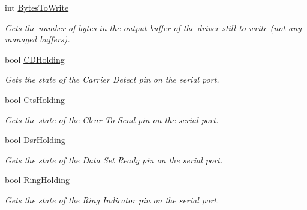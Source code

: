 \begin{DoxyCompactItemize}
int \mbox{\hyperlink{class_r_j_c_p_1_1_i_o_1_1_ports_1_1_native_1_1_unix_native_serial_a808ab45c7f5b01cf20ed91d731eef703}{Bytes\+To\+Write}}
\begin{DoxyCompactList}\small\item\em Gets the number of bytes in the output buffer of the driver still to write (not any managed buffers). \end{DoxyCompactList}\item 
bool \mbox{\hyperlink{class_r_j_c_p_1_1_i_o_1_1_ports_1_1_native_1_1_unix_native_serial_ae91656ef24b84073a58d2410a8c58ed2}{C\+D\+Holding}}
\begin{DoxyCompactList}\small\item\em Gets the state of the Carrier Detect pin on the serial port. \end{DoxyCompactList}\item 
bool \mbox{\hyperlink{class_r_j_c_p_1_1_i_o_1_1_ports_1_1_native_1_1_unix_native_serial_a7d0278566dd04c28b8d3f9e64a6edc6e}{Cts\+Holding}}
\begin{DoxyCompactList}\small\item\em Gets the state of the Clear To Send pin on the serial port. \end{DoxyCompactList}\item 
bool \mbox{\hyperlink{class_r_j_c_p_1_1_i_o_1_1_ports_1_1_native_1_1_unix_native_serial_aeeea0e04d75d558800e781b0088aee27}{Dsr\+Holding}}
\begin{DoxyCompactList}\small\item\em Gets the state of the Data Set Ready pin on the serial port. \end{DoxyCompactList}\item 
bool \mbox{\hyperlink{class_r_j_c_p_1_1_i_o_1_1_ports_1_1_native_1_1_unix_native_serial_a47ea836962f33561d9ddc712ac66c3c0}{Ring\+Holding}}
\begin{DoxyCompactList}\small\item\em Gets the state of the Ring Indicator pin on the serial port. \end{DoxyCompactList}\item 

\end{DoxyCompactItemize}
